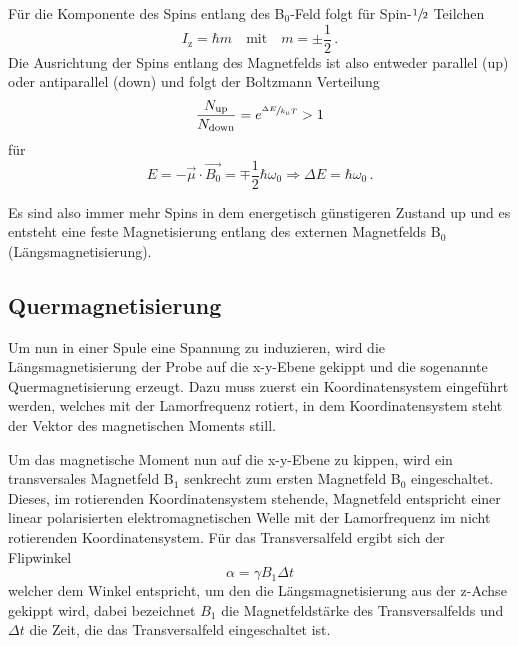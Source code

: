 Für die Komponente des Spins entlang des B$_{0}$-Feld folgt für Spin-$\sfrac{1}{2}$ Teilchen
\begin{equation*}
  I_\text{z} = \hbar m \quad \text{mit} \quad m = \pm\frac{1}{2} \, .
\end{equation*}
Die Ausrichtung der Spins entlang des Magnetfelds ist also entweder parallel (up) oder antiparallel (down) und
folgt der Boltzmann Verteilung
\begin{equation*}
  \frac{N_\text{up}}{N_\text{down}} = e^{\sfrac{\Delta E}{k_\text{B} T}} > 1
\end{equation*}
für
\begin{equation*}
  E = - \vec{\mu} \cdot \vec{B_0} = \mp \frac{1}{2} \hbar \omega_0 \Rightarrow \Delta E = \hbar \omega_0 \, .
\end{equation*}

Es sind also immer mehr Spins in dem energetisch günstigeren Zustand up und es entsteht eine feste Magnetisierung entlang des externen Magnetfelds B$_0$ (Längsmagnetisierung).


\subsection{Quermagnetisierung}

Um nun in einer Spule eine Spannung zu induzieren, wird die Längsmagnetisierung der Probe auf die x-y-Ebene gekippt und die sogenannte Quermagnetisierung erzeugt.
Dazu muss zuerst ein Koordinatensystem eingeführt werden, welches mit der Lamorfrequenz rotiert, in dem Koordinatensystem steht der Vektor des magnetischen Moments still.

Um das magnetische Moment nun auf die x-y-Ebene zu kippen, wird ein transversales Magnetfeld B$_1$ senkrecht zum ersten Magnetfeld B$_0$ eingeschaltet. Dieses, im rotierenden Koordinatensystem stehende, Magnetfeld entspricht einer linear polarisierten elektromagnetischen Welle mit der Lamorfrequenz im nicht rotierenden Koordinatensystem.
Für das Transversalfeld ergibt sich der Flipwinkel
\begin{equation*}
  \alpha = \gamma B_1 \Delta t
\end{equation*}
welcher dem Winkel entspricht, um den die Längsmagnetisierung aus der z-Achse gekippt wird, dabei bezeichnet $B_1$ die Magnetfeldstärke des Transversalfelds und $\Delta t$ die Zeit, die das Transversalfeld eingeschaltet ist.

